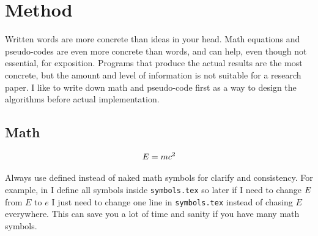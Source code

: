 \section{Method \feedbackNeeded}
\label{sec:method}

Written words are more concrete than ideas in your head.
Math equations and pseudo-codes are even more concrete than words, and can help, even though not essential, for exposition.
Programs that produce the actual results are the most concrete, but the amount and level of information is not suitable for a research paper.
I like to write down math and pseudo-code first as a way to design the algorithms before actual implementation.

\subsection{Math}
\label{sec:method:math}

\begin{align}
E = m c^2
\label{eqn:emc2}
\end{align}

Always use defined instead of naked math symbols for clarify and consistency.
For example, in  I define all symbols inside \texttt{symbols.tex} so later if I need to change $E$ from $E$ to $e$ I just need to change one line in \texttt{symbols.tex} instead of chasing $E$ everywhere.
This can save you a lot of time and sanity if you have many math symbols.
